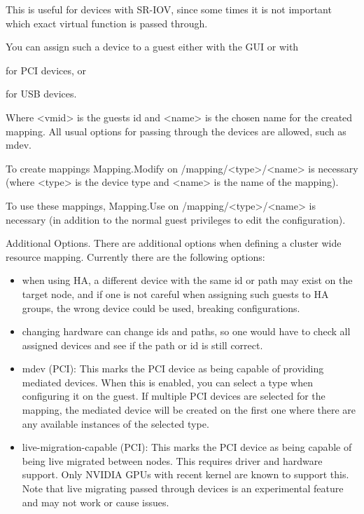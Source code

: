 This is useful for devices with SR-IOV, since some times it is not important which exact virtual function is passed through.

You can assign such a device to a guest either with the GUI or with

for PCI devices, or

for USB devices.

Where <vmid> is the guests id and <name> is the chosen name for the created mapping. All usual options for passing through the devices are allowed, such as mdev.

To create mappings Mapping.Modify on /mapping/<type>/<name> is necessary (where <type> is the device type and <name> is the name of the mapping).

To use these mappings, Mapping.Use on /mapping/<type>/<name> is necessary (in addition to the normal guest privileges to edit the configuration).

Additional Options. There are additional options when defining a cluster wide resource mapping. Currently there are the following options:

\begin{itemize}[leftmargin=2cm]

	\item when using HA, a different device with the same id or path may exist on the target node, and if one is not careful when assigning such guests to HA groups, the wrong device could be used, breaking configurations.

	\item changing hardware can change ids and paths, so one would have to check all assigned devices and see if the path or id is still correct.

\end{itemize}

\begin{itemize}[leftmargin=2cm]

	\item mdev (PCI): This marks the PCI device as being capable of providing mediated devices. When this is enabled, you can select a type when configuring it on the guest. If multiple PCI devices are selected for the mapping, the mediated device will be created on the first one where there are any available instances of the selected type.

	\item live-migration-capable (PCI): This marks the PCI device as being capable of being live migrated between nodes. This requires driver and hardware support. Only NVIDIA GPUs with recent kernel are known to support this. Note that live migrating passed through devices is an experimental feature and may not work or cause issues.

\end{itemize}

